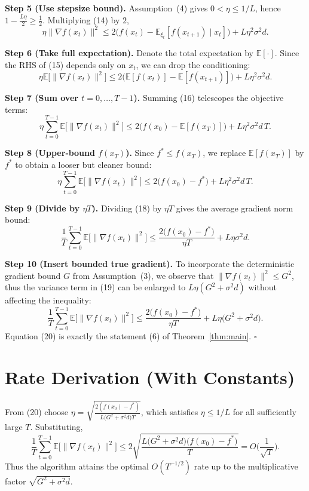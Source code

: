 \documentclass[11pt]{article}
\newcommand{\E}{\mathbb{E}}
\begin{document}
\noindent\textbf{Step 5 (Use stepsize bound).}  
Assumption~(4) gives $0<\eta\le 1/L$, hence $1-\frac{L\eta}{2}\ge \frac12$. Multiplying (14) by $2$,
\[
\eta\|\nabla f(x_t)\|^{2}
\le 2\!\big(f(x_t)-\E_{\xi_t}[f(x_{t+1})\mid x_t]\big)
+L\eta^{2}\sigma^{2}d .
\tag{15}
\]

\noindent\textbf{Step 6 (Take full expectation).}  
Denote the total expectation by $\E[\cdot]$. Since the RHS of (15) depends only on $x_t$, we can drop the conditioning:
\[
\eta\E\!\big[\|\nabla f(x_t)\|^{2}\big]
\le 2\!\big(\E[f(x_t)]-\E[f(x_{t+1})]\big)
+L\eta^{2}\sigma^{2}d .
\tag{16}
\]

\noindent\textbf{Step 7 (Sum over $t=0,\dots,T-1$).}  
Summing (16) telescopes the objective terms:
\[
\eta\sum_{t=0}^{T-1}\E\!\big[\|\nabla f(x_t)\|^{2}\big]
\le 2\big(f(x_0)-\E[f(x_T)]\big)
+L\eta^{2}\sigma^{2}d\,T .
\tag{17}
\]

\noindent\textbf{Step 8 (Upper‑bound $f(x_T)$).}  
Since $f^{*}\le f(x_T)$, we replace $\E[f(x_T)]$ by $f^{*}$ to obtain a looser but cleaner bound:
\[
\eta\sum_{t=0}^{T-1}\E\!\big[\|\nabla f(x_t)\|^{2}\big]
\le 2\big(f(x_0)-f^{*}\big)
+L\eta^{2}\sigma^{2}d\,T .
\tag{18}
\]

\noindent\textbf{Step 9 (Divide by $\eta T$).}  
Dividing (18) by $\eta T$ gives the average gradient norm bound:
\[
\frac{1}{T}\sum_{t=0}^{T-1}\E\!\big[\|\nabla f(x_t)\|^{2}\big]
\le \frac{2\big(f(x_0)-f^{*}\big)}{\eta T}
+L\eta\sigma^{2}d .
\tag{19}
\]

\noindent\textbf{Step 10 (Insert bounded true gradient).}  
To incorporate the deterministic gradient bound $G$ from Assumption~(3), we observe that $\|\nabla f(x_t)\|^{2}\le G^{2}$, thus the variance term in (19) can be enlarged to $L\eta(G^{2}+\sigma^{2}d)$ without affecting the inequality:
\[
\frac{1}{T}\sum_{t=0}^{T-1}\E\!\big[\|\nabla f(x_t)\|^{2}\big]
\le \frac{2\big(f(x_0)-f^{*}\big)}{\eta T}
+L\eta\big(G^{2}+\sigma^{2}d\big).
\tag{20}
\]
Equation (20) is exactly the statement (6) of Theorem~\ref{thm:main}. $\square$

\section*{Rate Derivation (With Constants)}
From (20) choose $\eta = \sqrt{\frac{2(f(x_0)-f^{*})}{L\big(G^{2}+\sigma^{2}d\big)T}}$, which satisfies $\eta\le 1/L$ for all sufficiently large $T$. Substituting,
\[
\frac{1}{T}\sum_{t=0}^{T-1}\E\!\big[\|\nabla f(x_t)\|^{2}\big]
\le 2\sqrt{\frac{L\big(G^{2}+\sigma^{2}d\big)\big(f(x_0)-f^{*}\big)}{T}}
=O\!\Big(\frac{1}{\sqrt{T}}\Big).
\]
Thus the algorithm attains the optimal $O(T^{-1/2})$ rate up to the multiplicative factor $\sqrt{G^{2}+\sigma^{2}d}$.
\end{document}

